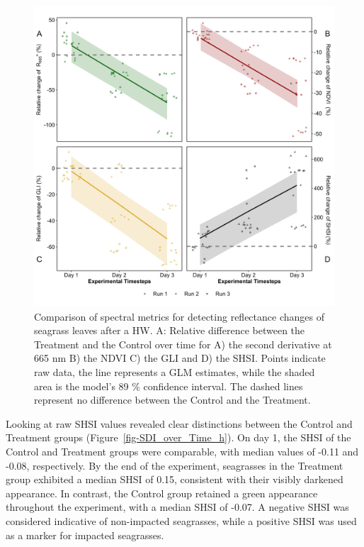\documentclass[
  letterpaper,
  11pt,
  english,
  singlespacing,
  headsepline]{MastersDoctoralThesis}
\begin{document}
\begin{spacing}{1.5}
\begin{figure}
{\includegraphics[width=0.95\linewidth,height=\textheight,keepaspectratio]{Chapter5/Figs/merged_indices.png}

}

\caption{\label{fig-Exp_Spectral_indices_h}Comparison of spectral
metrics for detecting reflectance changes of seagrass leaves after a HW.
A: Relative difference between the Treatment and the Control over time
for A) the second derivative at 665 nm B) the NDVI C) the GLI and D) the
SHSI. Points indicate raw data, the line represents a GLM estimates,
while the shaded area is the model's 89 \% confidence interval. The
dashed lines represent no difference between the Control and the
Treatment.}

\end{figure}%

Looking at raw SHSI values revealed clear distinctions between the
Control and Treatment groups (Figure~\ref{fig-SDI_over_Time_h}). On day
1, the SHSI of the Control and Treatment groups were comparable, with
median values of -0.11 and -0.08, respectively. By the end of the
experiment, seagrasses in the Treatment group exhibited a median SHSI of
0.15, consistent with their visibly darkened appearance. In contrast,
the Control group retained a green appearance throughout the experiment,
with a median SHSI of -0.07. A negative SHSI was considered indicative
of non-impacted seagrasses, while a positive SHSI was used as a marker
for impacted seagrasses.


\end{spacing}
\end{document}
